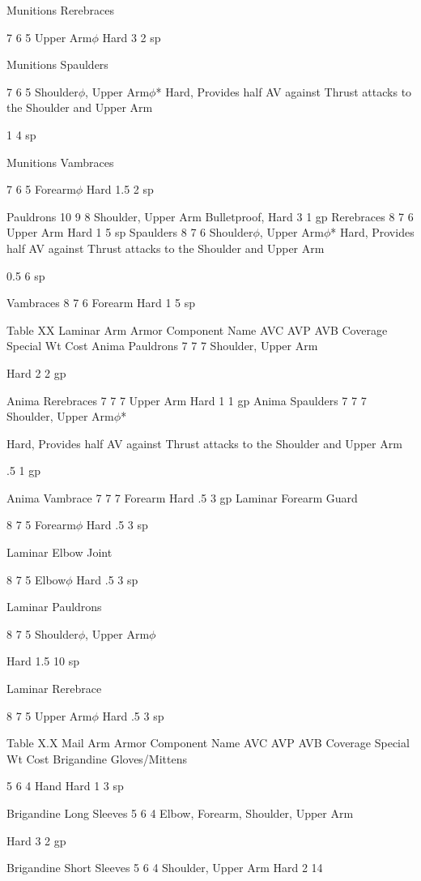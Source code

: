 \documentclass[oneside,11pt,english]{book}
\begin{document}
Munitions 
Rerebraces 

7 6 5 Upper Arm$\phi$ Hard 3 2 sp 

Munitions 
Spaulders 

7 6 5 Shoulder$\phi$, Upper Arm$\phi$* Hard, Provides half AV against Thrust 
attacks to the Shoulder and Upper Arm 

1 4 sp 

Munitions 
Vambraces 

7 6 5 Forearm$\phi$ Hard 1.5 2 sp 

Pauldrons 10 9 8 Shoulder, Upper Arm Bulletproof, Hard 3 1 gp 
Rerebraces 8 7 6 Upper Arm Hard 1 5 sp 
Spaulders 8 7 6 Shoulder$\phi$, Upper Arm$\phi$* Hard, Provides half AV against Thrust 
attacks to the Shoulder and Upper Arm 

0.5 6 sp 

Vambraces 8 7 6 Forearm Hard 1 5 sp 

 
Table XX Laminar Arm Armor 
Component Name AVC AVP AVB Coverage Special Wt Cost 
Anima Pauldrons 7 7 7 Shoulder, Upper 
Arm 

Hard 2 2 gp 

Anima Rerebraces 7 7 7 Upper Arm Hard 1 1 gp 
Anima Spaulders 7 7 7 Shoulder, Upper 
Arm$\phi$* 

Hard, Provides half AV against Thrust attacks 
to the Shoulder and Upper Arm 

.5 1 gp 

Anima Vambrace 7 7 7 Forearm Hard .5 3 gp 
Laminar Forearm 
Guard 

8 7 5 Forearm$\phi$ Hard .5 3 sp 

Laminar Elbow 
Joint 

8 7 5 Elbow$\phi$ Hard .5 3 sp 

Laminar 
Pauldrons 

8 7 5 Shoulder$\phi$, Upper 
Arm$\phi$ 

Hard 1.5 10 
sp 

Laminar 
Rerebrace 

8 7 5 Upper Arm$\phi$ Hard .5 3 sp 

 
Table X.X Mail Arm Armor 
Component Name AVC AVP AVB Coverage Special Wt Cost 
Brigandine 
Gloves/Mittens 

5 6 4 Hand Hard 1 3 sp 

Brigandine Long Sleeves 5 6 4 Elbow, Forearm, Shoulder, Upper 
Arm 

Hard 3 2 gp 

Brigandine Short Sleeves 5 6 4 Shoulder, Upper Arm Hard 2 14 
\end{document}

